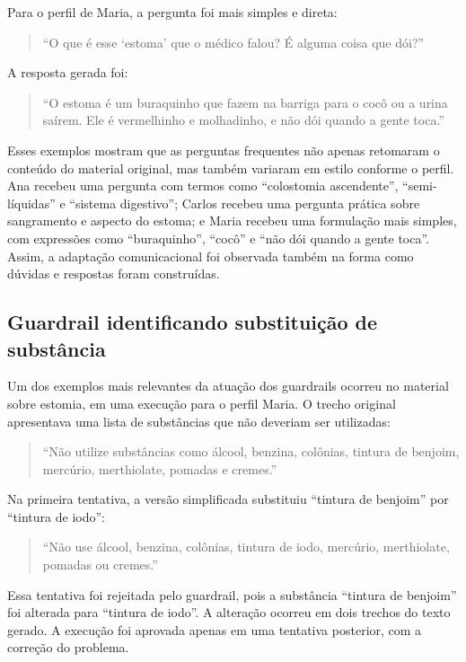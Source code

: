 Para o perfil de Maria, a pergunta foi mais simples e direta:

\begin{quote}
``O que é esse `estoma' que o médico falou? É alguma coisa que dói?''
\end{quote}

A resposta gerada foi:

\begin{quote}
``O estoma é um buraquinho que fazem na barriga para o cocô ou a urina saírem. Ele é vermelhinho e molhadinho, e não dói quando a gente toca.''
\end{quote}

Esses exemplos mostram que as perguntas frequentes não apenas retomaram o conteúdo do material original, mas também variaram em estilo conforme o perfil. Ana recebeu uma pergunta com termos como ``colostomia ascendente'', ``semi-líquidas'' e ``sistema digestivo''; Carlos recebeu uma pergunta prática sobre sangramento e aspecto do estoma; e Maria recebeu uma formulação mais simples, com expressões como ``buraquinho'', ``cocô'' e ``não dói quando a gente toca''. Assim, a adaptação comunicacional foi observada também na forma como dúvidas e respostas foram construídas.

\subsection{Guardrail identificando substituição de substância}
\label{subsec:guardrail-substituicao-substancia}

Um dos exemplos mais relevantes da atuação dos guardrails ocorreu no material sobre estomia, em uma execução para o perfil Maria. O trecho original apresentava uma lista de substâncias que não deveriam ser utilizadas:

\begin{quote}
``Não utilize substâncias como álcool, benzina, colônias, tintura de benjoim, mercúrio, merthiolate, pomadas e cremes.''
\end{quote}

Na primeira tentativa, a versão simplificada substituiu ``tintura de benjoim'' por ``tintura de iodo'':

\begin{quote}
``Não use álcool, benzina, colônias, tintura de iodo, mercúrio, merthiolate, pomadas ou cremes.''
\end{quote}

Essa tentativa foi rejeitada pelo guardrail, pois a substância ``tintura de benjoim'' foi alterada para ``tintura de iodo''. A alteração ocorreu em dois trechos do texto gerado. A execução foi aprovada apenas em uma tentativa posterior, com a correção do problema.

